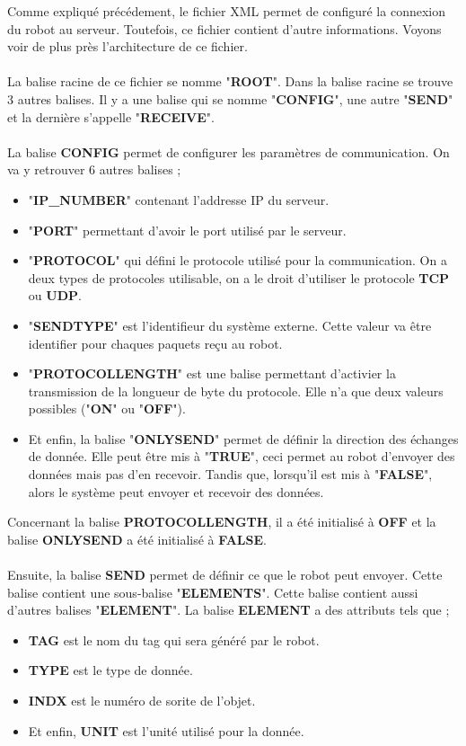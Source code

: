 Comme expliqué précédement, le fichier XML permet de configuré la connexion du robot au serveur.
Toutefois, ce fichier contient d'autre informations.
Voyons voir de plus près l'architecture de ce fichier.
\\
\\
La balise racine de ce fichier se nomme "\textbf{ROOT}".
Dans la balise racine se trouve 3 autres balises.
Il y a une balise qui se nomme "\textbf{CONFIG}", une autre "\textbf{SEND}" et la dernière s'appelle "\textbf{RECEIVE}".
\\
\\
La balise \textbf{CONFIG} permet de configurer les paramètres de communication.
On va y retrouver 6 autres balises ;
\begin{itemize}
    \item "\textbf{IP\_NUMBER}" contenant l'addresse IP du serveur.
    \item "\textbf{PORT}" permettant d'avoir le port utilisé par le serveur.
    \item "\textbf{PROTOCOL}" qui défini le protocole utilisé pour la communication. On a deux types de protocoles utilisable, on a le droit d'utiliser le protocole \textbf{TCP} ou \textbf{UDP}.
    \item "\textbf{SENDTYPE}" est l'identifieur du système externe. Cette valeur va être identifier pour chaques paquets reçu au robot.
    \item "\textbf{PROTOCOLLENGTH}" est une balise permettant d'activier la transmission de la longueur de byte du protocole. Elle n'a que deux valeurs possibles ("\textbf{ON}" ou "\textbf{OFF}").
    \item Et enfin, la balise "\textbf{ONLYSEND}" permet de définir la direction des échanges de donnée. Elle peut être mis à "\textbf{TRUE}", ceci permet au robot d'envoyer des données mais pas d'en recevoir. Tandis que, lorsqu'il est mis à "\textbf{FALSE}", alors le système peut envoyer et recevoir des données. 
\end{itemize}
Concernant la balise \textbf{PROTOCOLLENGTH}, il a été initialisé à \textbf{OFF} et la balise \textbf{ONLYSEND} a été initialisé à \textbf{FALSE}.
\\
\\
Ensuite, la balise \textbf{SEND} permet de définir ce que le robot peut envoyer.
Cette balise contient une sous-balise "\textbf{ELEMENTS}".
Cette balise contient aussi d'autres balises "\textbf{ELEMENT}".
La balise \textbf{ELEMENT} a des attributs tels que ;
\begin{itemize}
    \item \textbf{TAG} est le nom du tag qui sera généré par le robot.
    \item \textbf{TYPE} est le type de donnée.
    \item \textbf{INDX} est le numéro de sorite de l'objet.
    \item Et enfin, \textbf{UNIT} est l'unité utilisé pour la donnée.
\end{itemize}
